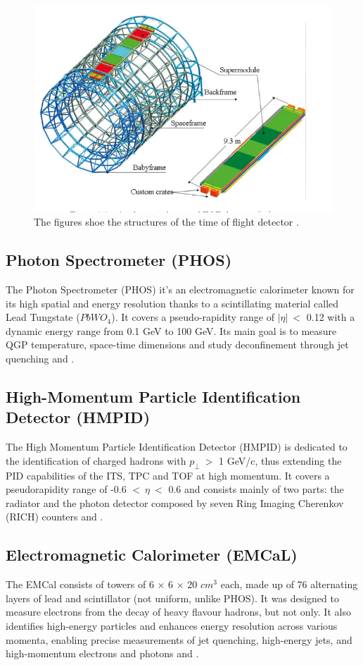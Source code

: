 \documentclass[12pt,a4paper]{book}
\begin{document}
	\begin{figure}
		\centering
		\includegraphics[width=0.5\linewidth]{pictures/TOF.png}
		\caption{The figures shoe the structures of the time of flight detector \cite{ALICE:2014sbxFs}.}
		\label{fig:TOF}
	\end{figure}
	\FloatBarrier
	
	\subsection{Photon Spectrometer (PHOS)}
	The Photon Spectrometer (PHOS) it's an electromagnetic calorimeter known for its  high spatial and energy resolution thanks to a scintillating material called Lead Tungstate ($PbWO_4$). It covers a pseudo-rapidity range of $ |\eta|\ <$ 0.12 with a dynamic energy range from 0.1 GeV to 100 GeV. Its main goal is to measure QGP temperature, space-time dimensions and study deconfinement through jet quenching \cite{Padhan:2924203} and \cite{amsdottorato9036}.
	
	\subsection{High-Momentum Particle Identification Detector (HMPID)}
	The High Momentum Particle Identification Detector (HMPID) is dedicated to the identification of charged hadrons with $p_\perp \ >$ 1 GeV/c, thus extending the PID capabilities of the ITS, TPC and TOF at high momentum. It covers a pseudorapidity range of -0.6 $< \ \eta \ < $ 0.6 and consists mainly of two parts: the radiator and the photon detector composed by seven Ring Imaging Cherenkov (RICH) counters \cite{Padhan:2924203} and \cite{amsdottorato9036}.
	
	\subsection{Electromagnetic Calorimeter (EMCaL)}
	The EMCal consists of towers of 6 × 6 × 20 $cm^3$ each, made up of 76 alternating layers of lead and scintillator (not uniform, unlike PHOS). It was designed to measure electrons from the decay of heavy flavour hadrons, but not only. It also identifies high-energy particles and enhances energy resolution across various momenta, enabling precise measurements of jet quenching, high-energy jets, and high-momentum electrons and photons \cite{Padhan:2924203} and \cite{Arata:2922803}.
	
\end{document}
